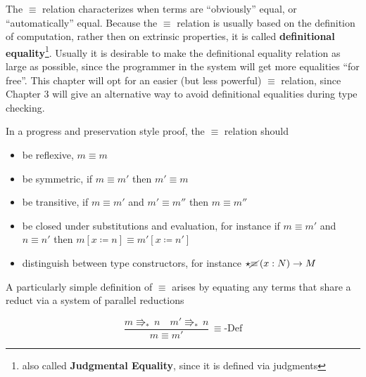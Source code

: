 The $\equiv$ relation characterizes when terms are ``obviously'' equal, or ``automatically'' equal.
Because the $\equiv$ relation is usually based on the definition of computation, rather then on extrinsic properties, it is called \textbf{definitional equality}\footnote{also called \textbf{Judgmental Equality}, since it is defined via judgments}.
Usually it is desirable to make the definitional equality relation as large as possible, since the programmer in the system will get more equalities ``for free''.
This chapter will opt for an easier (but less powerful) $\equiv$ relation, since Chapter 3 will give an alternative way to avoid definitional equalities during type checking.

In a progress and preservation style proof, the $\equiv$ relation should 

\begin{itemize}
\item be reflexive, $m\equiv m$ 
\item be symmetric, if $m\equiv m'$ then $m'\equiv m$ 
\item be transitive, if $m\equiv m'$ and $m'\equiv m''$ then $m\equiv m''$ 
\item be closed under substitutions and evaluation, for instance if $m\equiv m'$ and $n\equiv n'$ then $m\left[x\coloneqq n\right]\equiv m'\left[x\coloneqq n'\right]$ 
\item distinguish between type constructors, for instance $\star\cancel{\equiv}\left(x:N\right)\rightarrow M$ 
\end{itemize}
A particularly simple definition of $\equiv$ arises by equating any terms that share a reduct via a system of parallel reductions

\[
\frac{m\Rrightarrow_{\ast}\,n\quad m'\Rrightarrow_{\ast}\,n}{m\equiv m'}\,\equiv\textrm{-Def}
\]


